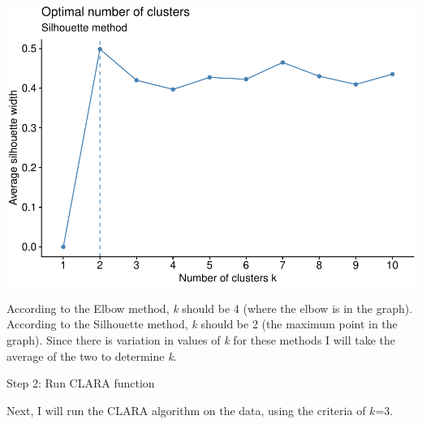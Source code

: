 \documentclass[12pt,twoside]{amherstthesis}
\begin{document}
  \begin{Shaded}
  \begin{Highlighting}[]
   \NormalTok{) }\OperatorTok{+}
  \StringTok{  }\NormalTok{(} \NormalTok{)}
  \end{Highlighting}
  \end{Shaded}
  
  \begin{center}\includegraphics{Comps_Proj_files/figure-latex/unnamed-chunk-5-2} \end{center}
  
  According to the Elbow method, \emph{k} should be 4 (where the elbow is
  in the graph). According to the Silhouette method, \emph{k} should be 2
  (the maximum point in the graph). Since there is variation in values of
  \emph{k} for these methods I will take the average of the two to
  determine \emph{k}.
  
  Step 2: Run CLARA function
  
  Next, I will run the CLARA algorithm on the data, using the criteria of
  \(k\)=3.
  
  \begin{Shaded}
  \begin{Highlighting}[]
  \StringTok{ }\NormalTok{(new[}\OperatorTok{:}\NormalTok{], }\NormalTok{)}
  \end{Highlighting}
  \end{Shaded}
  
\end{document}
